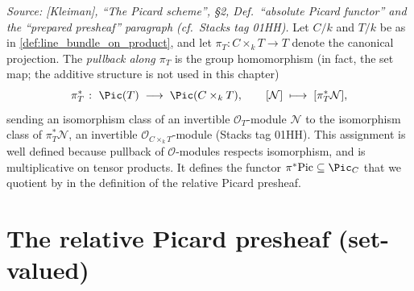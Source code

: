\begin{definition}
  \label{def:pullback_along_projection}
  
  \textit{Source: [Kleiman], ``The Picard scheme'', §2,
  Def.~``absolute Picard functor'' and the ``prepared presheaf'' paragraph
  (cf.\ Stacks tag 01HH).}
  Let \(C/k\) and \(T/k\) be as in
  \cref{def:line_bundle_on_product}, and let \(\pi_T : C \times_k T \to T\)
  denote the canonical projection. The \emph{pullback along \(\pi_T\)} is the
  group homomorphism (in fact, the set map; the additive structure is not used
  in this chapter)
  \[
    \pi_T^* \;\colon\; \Pic(T) \;\longrightarrow\; \Pic(C \times_k T),
    \qquad [\mathcal{N}] \;\longmapsto\; [\pi_T^* \mathcal{N}],
  \]
  sending an isomorphism class of an invertible \(\mathcal{O}_T\)-module
  \(\mathcal{N}\) to the isomorphism class of \(\pi_T^*\mathcal{N}\), an invertible
  \(\mathcal{O}_{C \times_k T}\)-module (Stacks tag 01HH). This assignment is well
  defined because pullback of \(\mathcal{O}\)-modules respects isomorphism, and is
  multiplicative on tensor products. It defines the functor
  \(\pi^* \mathrm{Pic} \subseteq \Pic_C\) that we quotient by in the definition of
  the relative Picard presheaf.
\end{definition}


\section{The relative Picard presheaf (set-valued)}
\label{sec:lbp_relpic_quotient}

